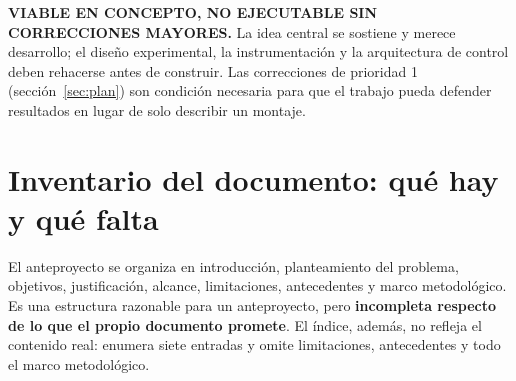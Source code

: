 \documentclass[11pt,a4paper]{article}
\begin{document}
\begin{tcolorbox}[tarjetaDato, title={Veredicto global}]
\textbf{VIABLE EN CONCEPTO, NO EJECUTABLE SIN CORRECCIONES MAYORES.} La idea central se sostiene y merece desarrollo; el diseño experimental, la instrumentación y la arquitectura de control deben rehacerse antes de construir. Las correcciones de prioridad 1 (sección~\ref{sec:plan}) son condición necesaria para que el trabajo pueda defender resultados en lugar de solo describir un montaje.
\end{tcolorbox}

\section{Inventario del documento: qué hay y qué falta}

El anteproyecto se organiza en introducción, planteamiento del problema, objetivos, justificación, alcance, limitaciones, antecedentes y marco metodológico. Es una estructura razonable para un anteproyecto, pero \textbf{incompleta respecto de lo que el propio documento promete}. El índice, además, no refleja el contenido real: enumera siete entradas y omite limitaciones, antecedentes y todo el marco metodológico.
\end{document}

